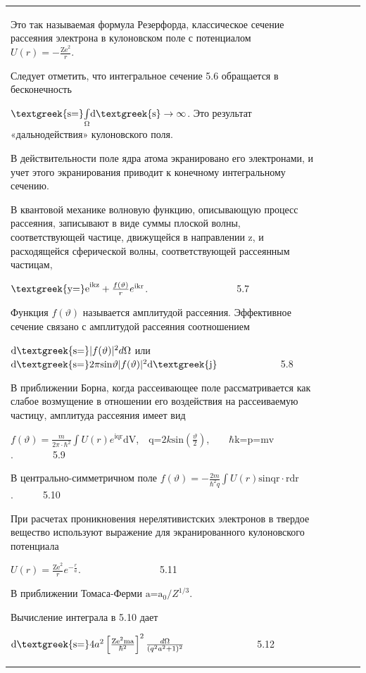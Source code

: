 \documentclass[a4paper,14pt, openany, twoside, draft]{extbook} %
\begin{document}
\begin{flushleft}
\begin{supertabular}{|m{1.7279999cm}|m{1.522cm}|m{1.522cm}|m{1.522cm}|m{1.744cm}|}
Это так называемая формула Резерфорда, классическое сечение рассеяния электрона в кулоновском поле с потенциалом \ \  $U(r)=-\frac{{\text{Ze}}^2} r$.

Следует отметить, что интегральное сечение 5.6 обращается в бесконечность

 ${\text{\textgreek{s=}}}\underset{\Omega }{\int }{\text{d\textgreek{s}}}\rightarrow \infty $. Это результат «дальнодействия» кулоновского поля.

В действительности поле ядра атома экранировано его электронами, и учет этого экранирования приводит к конечному интегральному сечению.

В квантовой механике волновую функцию, описывающую процесс рассеяния, записывают в виде суммы плоской волны, соответствующей частице, движущейся в направлении z, и расходящейся сферической волны, соответствующей рассеянным частицам,

 ${\text{\textgreek{y=}e}}^{{\text{ikz}}}+\frac{f(\vartheta )} re^{{\text{ikr}}}$.\ \ \ \ \ \ \ \ \ \ \ \ \ \ \ \ \ \ 5.7

Функция  $f(\vartheta )$ называется амплитудой рассеяния. Эффективное сечение связано с амплитудой рассеяния соотношением

 ${\text{d\textgreek{s=}}}|f(\vartheta )|^2d\Omega $ или  ${\text{d\textgreek{s=}}}2\pi \text{sin}\vartheta |f(\vartheta )|^2{\text{d\textgreek{j}}}$ \ \ \ \ \ \ \ \ \ \ \ \ 5.8

В приближении Борна, когда рассеивающее поле рассматривается как слабое возмущение в отношении его воздействия на рассеиваемую частицу, амплитуда рассеяния имеет вид

 $f(\vartheta )=\frac m{2\pi \cdot \hbar ^2}\int U(r)e^{{\text{iqr}}}{\text{dV}}$,\ \  ${\text{q=}}2k\text{sin}(\frac{\vartheta } 2)$,\ \ \ \  $\hbar {\text{k=p=mv}}$.\ \ \ \ \ \ \ \ 5.9

В центрально-симметричном поле  $f(\vartheta )=-\frac{2m}{\hbar ^2q}\int U(r)\text{sin}{\text{qr}}\cdot {\text{rdr}}$.\ \ \ \ \ \ 5.10

При расчетах проникновения нерелятивистских электронов в твердое вещество используют выражение для экранированного кулоновского потенциала

 $U(r)=\frac{{\text{Ze}}^2} re^{-\frac r a}$.\ \ \ \ \ \ \ \ \ \ \ \ \ \ \ \ 5.11

В приближении Томаса-Ферми  ${\text{a=a}}_0/Z^{1/3}$.

Вычисление интеграла в 5.10 дает\ \

 ${\text{d\textgreek{s=}}}4a^2\left[\frac{{\text{Ze}}^2{\text{ma}}}{\hbar ^2}\right]^2\frac{d\Omega }{(q^2a^2+1)^2}$ \ \ \ \ \ \ \ \ \ \ \ \ \ \ 5.12


\end{supertabular}
\end{flushleft}
\end{document}
